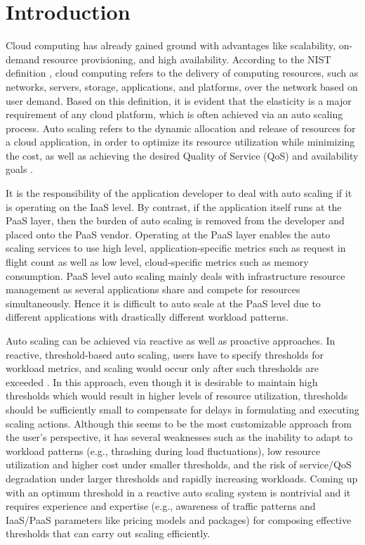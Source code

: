 \section{Introduction}
Cloud computing has already gained ground with advantages like scalability, on-demand resource provisioning, and high availability. According to the NIST definition \cite{Mell_2011}, cloud computing refers to the delivery of computing resources, such as networks, servers, storage, applications, and platforms, over the network based on user demand. Based on this definition, it is evident that the elasticity is a major requirement of any cloud platform, which is often achieved via an auto scaling process. Auto scaling refers to the dynamic allocation and release of resources for a cloud application, in order to optimize its resource utilization while minimizing the cost, as well as achieving the desired Quality of Service (QoS) and availability goals \cite{Roy_2011} \cite{Armbrust_2010}.

It is the responsibility of the application developer to deal with auto scaling if it is operating on the IaaS level. By contrast, if the application itself runs at the PaaS layer, then the burden of auto scaling is removed from the developer and placed onto the PaaS vendor. Operating at the PaaS layer enables the auto scaling services to use high level, application-specific metrics such as request in flight count as well as low level, cloud-specific metrics such as memory consumption. PaaS level auto scaling mainly deals with infrastructure resource management as several applications share and compete for resources simultaneously. Hence it is difficult to auto scale at the PaaS level due to different applications with drastically different workload patterns.  

Auto scaling can be achieved via reactive as well as proactive approaches. In reactive, threshold-based auto scaling, users have to specify thresholds for workload metrics, and scaling would occur only after such thresholds are exceeded \cite{Lorido_Botran_2014}. In this approach, even though it is desirable to maintain high thresholds which would result in higher levels of resource utilization, thresholds should be sufficiently small to compensate for delays in formulating and executing scaling actions. Although this seems to be the most customizable approach from the user’s perspective, it has several weaknesses \cite{Alipour_2014} such as the inability to adapt to workload patterns (e.g., thrashing during load fluctuations), low resource utilization and higher cost under smaller thresholds, and the risk of service/QoS degradation under larger thresholds and rapidly increasing workloads. Coming up with an optimum threshold in a reactive auto scaling system is nontrivial and it requires experience and expertise (e.g., awareness of traffic patterns and IaaS/PaaS parameters like pricing models and packages) for composing effective thresholds that can carry out scaling efficiently.

